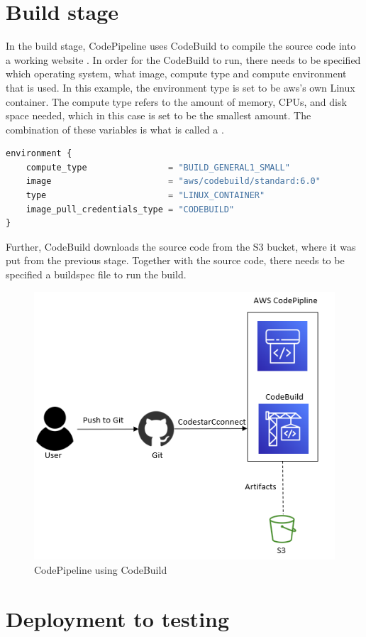 \section{Build stage}
In the build stage, CodePipeline uses CodeBuild to compile the source code into a working website \cite{CodeBuildProcess}. In order for the CodeBuild to run, there needs to be specified which operating system, what image, compute type and compute environment that is used. In this example, the environment type is set to be \acrshort{aws}'s own Linux container. The compute type refers to the amount of memory, CPUs, and disk space needed, which in this case is set to be the smallest amount. The combination of these variables is what is called a .

\begin{lstlisting}[language=terraform, caption=Create build environment, captionpos=b, frame=single]
environment {
    compute_type                = "BUILD_GENERAL1_SMALL"
    image                       = "aws/codebuild/standard:6.0"
    type                        = "LINUX_CONTAINER"
    image_pull_credentials_type = "CODEBUILD"
}
\end{lstlisting}

Further, CodeBuild downloads the source code from the S3 bucket, where it was put from the previous stage. Together with the source code, there needs to be specified a \gls{buildspec} file to run the build.

\vspace{2mm}
\begin{figure}[H]
    \centering
    \includegraphics[width=0.6\columnwidth]{Images/aws-piplin-3.png}
    \caption{CodePipeline using CodeBuild}
    \label{fig: CodePipeline using CodeBuild}
\end{figure}

\section{Deployment to testing}
\label{Deployment to testing}
